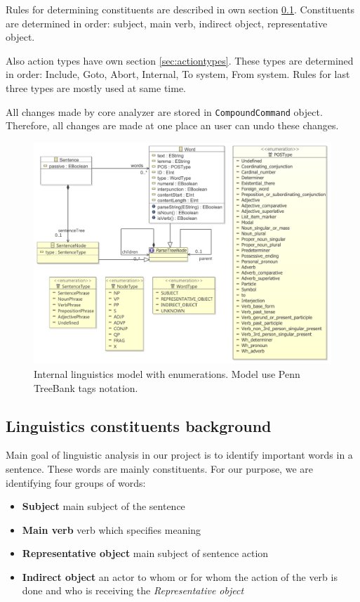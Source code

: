 Rules for determining constituents are described in own section \ref{sec:lingbackground}. Constituents are determined in order: subject, main verb, indirect object, representative object.

Also action types have own section \ref{sec:actiontypes}. These types are determined in order: Include, Goto, Abort, Internal, To system, From system. Rules for last three types are mostly used at same time.

All changes made by core analyzer are stored in \verb|CompoundCommand| object. Therefore, all changes are made at one place an user can undo these changes.

\begin{figure}[ht]
  \centering
  \includegraphics[width=\textwidth]{images/ReprotoolLingModel}
  \caption{Internal linguistics model with enumerations.  Model use Penn TreeBank tags notation.}
  \label{fig:ReprotoolLingModel}
\end{figure}

\subsection{Linguistics constituents background}
\label{sec:lingbackground}
Main goal of linguistic analysis in our project is to identify important words in a sentence. These words are mainly constituents. For our purpose, we are identifying four groups of words:

\begin{itemize}
\item {\bf Subject} main subject of the sentence
\item {\bf Main verb} verb which specifies meaning
\item {\bf Representative object} main subject of sentence action
\item {\bf Indirect object} an actor to whom or for whom the action of the verb is done and who is receiving the \emph{Representative object}
\end{itemize}

